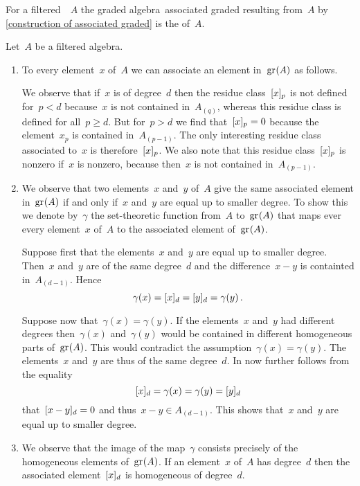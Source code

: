 \begin{definition}
  For a filtered~{\algebra{$\kf$}}~$A$ the graded algebra~\gls*{associated graded} resulting from~$A$ by \cref{construction of associated graded} is the  of~$A$.
\end{definition}


\begin{fluff}
  Let~$A$ be a filtered algebra.
  \begin{enumerate}
    \item
      To every element~$x$ of~$A$ we can associate an element in~$\gr(A)$ as follows.

      We observe that if~$x$ is of degree~$d$ then the residue class~$\lbrack x\rbrack_p$ is not defined for~$p < d$ because~$x$ is not contained in~$A_{(q)}$, whereas this residue class is defined for all~$p \geq d$.
      But for~$p > d$ we find that~$\lbrack x\rbrack_p = 0$ because the element~$x_p$ is contained in~$A_{(p-1)}$.
      The only interesting residue class associated to~$x$ is therefore~$\lbrack x\rbrack_p$.
      We also note that this residue class~$\lbrack x\rbrack_p$ is nonzero if~$x$ is nonzero, because then~$x$ is not contained in~$A_{(p-1)}$.
    \item
      We observe that two elements~$x$ and~$y$ of~$A$ give the same associated element in~$\gr(A)$ if and only if~$x$ and~$y$ are equal up to smaller degree.
      To show this we denote by~$\gamma$ the set-theoretic function from~$A$ to~$\gr(A)$ that maps ever every element~$x$ of~$A$ to the associated element of~$\gr(A)$.
      
      Suppose first that the elements~$x$ and~$y$ are equal up to smaller degree.
      Then~$x$ and~$y$ are of the same degree~$d$ and the difference~$x - y$ is containted in~$A_{(d-1)}$.
      Hence
      \[
        \gamma(x) = \lbrack x\rbrack_d = \lbrack y\rbrack_d = \gamma(y) \,.
      \]
      
      Suppose now that~$\gamma(x) = \gamma(y)$.
      If the elements~$x$ and~$y$ had different degrees then~$\gamma(x)$ and~$\gamma(y)$ would be contained in different homogeneous parts of~$\gr(A)$.
      This would contradict the assumption~$\gamma(x) = \gamma(y)$.
      The elements~$x$ and~$y$ are thus of the same degree~$d$.
      In now further follows from the equality
      \[
        \lbrack x\rbrack_d
        =
        \gamma(x)
        =
        \gamma(y)
        =
        \lbrack y\rbrack_d
      \]
      that~$\lbrack x - y\rbrack_d = 0$ and thus~$x - y \in A_{(d-1)}$.
      This shows that~$x$ and~$y$ are equal up to smaller degree.
    \item
      We observe that the image of the map~$\gamma$ consists precisely of the homogeneous elements of~$\gr(A)$.
      If an element~$x$ of~$A$ has degree~$d$ then the associated element~$\lbrack x\rbrack_d$ is homogeneous of degree~$d$.
  \end{enumerate}
\end{fluff}


